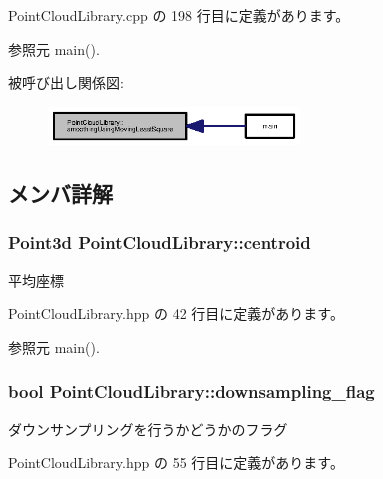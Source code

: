  Point\-Cloud\-Library.\-cpp の 198 行目に定義があります。



参照元 main().



被呼び出し関係図\-:\nopagebreak
\begin{figure}[H]
\begin{center}
\leavevmode
\includegraphics[width=189pt]{class_point_cloud_library_a2899ca3f4f6b2f8bce39524fba686e74_icgraph}
\end{center}
\end{figure}




\subsection{メンバ詳解}
\subsubsection[{centroid}]{\setlength{\rightskip}{0pt plus 5cm}Point3d Point\-Cloud\-Library\-::centroid}\label{class_point_cloud_library_aa8b11edec4c6910b0a9ad5c5340dcfa2}


平均座標 



 Point\-Cloud\-Library.\-hpp の 42 行目に定義があります。



参照元 main().

\subsubsection[{downsampling\-\_\-flag}]{\setlength{\rightskip}{0pt plus 5cm}bool Point\-Cloud\-Library\-::downsampling\-\_\-flag}\label{class_point_cloud_library_a6bb70f323f325576a505c45edd1f2ebe}


ダウンサンプリングを行うかどうかのフラグ 



 Point\-Cloud\-Library.\-hpp の 55 行目に定義があります。



